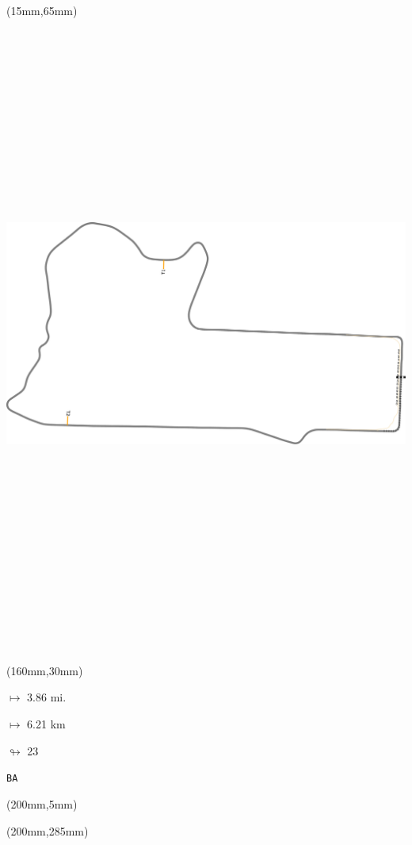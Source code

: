 \begin{textblock*}{185mm}(15mm,65mm)%
\centering
\mbox{\includegraphics[width=185mm,height=210mm,keepaspectratio]{PT/BA.pdf}}
\end{textblock*}
\begin{textblock*}{40mm}(160mm,30mm)%
\Large
\par$\mapsto$ 3.86 mi.
\par$\mapsto$ 6.21 km
\par$\looparrowright$ 23
\par\hfill\tiny\tt BA\\
\end{textblock*}
\begin{textblock*}{20mm}(200mm,5mm)%
\fbox{\thepage}
\label{BA}
\end{textblock*}
\begin{textblock*}{20mm}(200mm,285mm)%
\fbox{\thepage}
\end{textblock*}


